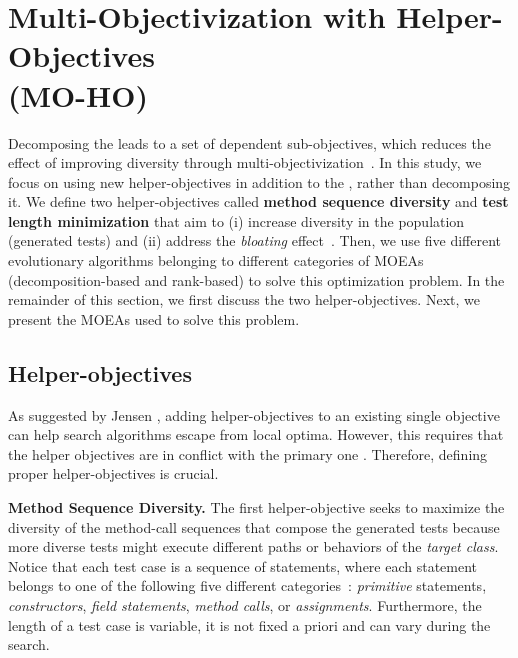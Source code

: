 
\section{Multi-Objectivization with Helper-Objectives\\ (MO-HO)}
\label{section:approach}

Decomposing the \CrashFunction leads to a set of dependent sub-objectives, which reduces the effect of improving diversity through multi-objectivization~\cite{jensen2004helper}. In this study,  we focus on using new helper-objectives in addition to the \CrashFunction, rather than decomposing it. We define two helper-objectives called \textbf{method sequence diversity} and \textbf{test length minimization} that aim to (i) increase diversity in the population (\ie generated tests) and (ii) address the \textit{bloating} effect~\cite{mondal2015, Panichella2018}.
Then, we use five different evolutionary algorithms belonging to different categories of MOEAs (\eg decomposition-based and rank-based) to solve this optimization problem. In the remainder of this section, we first discuss the two helper-objectives. Next, we present the MOEAs used to solve this problem.

\subsection{Helper-objectives}

As suggested by Jensen \etal \cite{jensen2004helper}, adding helper-objectives to an existing single objective can help search algorithms escape from local optima. However, this requires that the helper objectives are in conflict with the primary one \cite{jensen2004helper}. Therefore, defining proper helper-objectives is crucial. 

\textbf{Method Sequence Diversity.}
%
The first helper-objective seeks to maximize the diversity of the method-call sequences that compose the generated tests because more diverse tests might execute different paths or behaviors of the \textit{target class}. Notice that each test case is a sequence of statements, where each statement belongs to 
one of the following five different categories~\cite{Panichella2018}: \textit{primitive} statements, \textit{constructors}, \textit{field statements}, \textit{method calls}, or \textit{assignments}. Furthermore, the length of a test case is variable, \ie it is not fixed a priori and can vary during the search.


